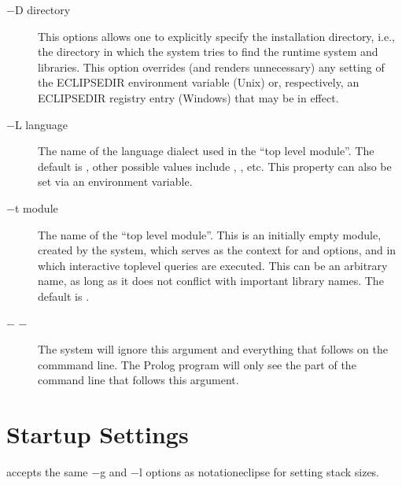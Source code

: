 \begin{description}
\item[$-$D directory]
This options allows one to explicitly specify the {\eclipse} installation
directory, i.e., the directory in which the system tries to find
the {\eclipse} runtime system and libraries.  This option overrides
(and renders unnecessary) any setting of the ECLIPSEDIR environment
variable (Unix) or, respectively, an ECLIPSEDIR registry entry
(Windows) that may be in effect.

\item[$-$L language]
The name of the language dialect used in the ``top level module''.
The default is , other possible values
include , ,  etc.
This property can also be set via an 
environment variable.

\item[$-$t module]
The name of the ``top level module''.  This is an initially empty module,
created by the system, which serves as the context for  and
 options, and in which interactive toplevel queries are executed.
This can be an arbitrary name, as long as it does not conflict with
important library names.  The default is .

\item[$-$ $-$]\cmdlineoptionidx{-}
The {\eclipse} system will ignore this argument and everything that follows on
the commmand line. The Prolog program will only see the part of the
command line that follows this argument.
\end{description}


\section{{\tkeclipse} Startup Settings}

 accepts the same $-$g and $-$l options as
notation{eclipse} for setting stack sizes.

